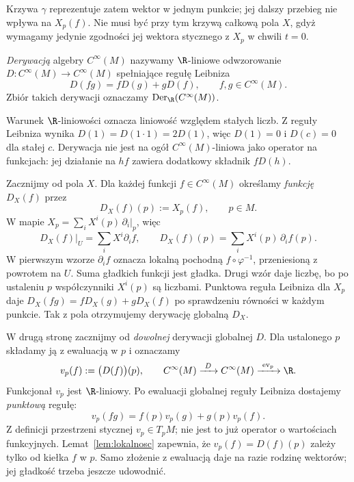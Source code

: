 Krzywa $\gamma$ reprezentuje zatem wektor w jednym
punkcie; jej dalszy przebieg nie wpływa na $X_p(f)$.
Nie musi być przy tym krzywą całkową pola $X$,
gdyż wymagamy jedynie zgodności jej wektora stycznego
z $X_p$ w chwili $t=0$.


\begin{definicja}
\emph{Derywacją} algebry $C^\infty(M)$ nazywamy $\R$-liniowe odwzorowanie
$D\colon C^\infty(M)\to C^\infty(M)$ spełniające regułę Leibniza
\[
 D(fg)=fD(g)+gD(f),\qquad f,g\in C^\infty(M).
\]
Zbiór takich derywacji oznaczamy $\operatorname{Der}_{\R}(C^\infty(M))$.
\end{definicja}

Warunek $\R$-liniowości oznacza liniowość względem stałych liczb.
Z reguły Leibniza wynika $D(1)=D(1\cdot1)=2D(1)$, więc $D(1)=0$
i $D(c)=0$ dla stałej $c$. Derywacja nie jest na ogół
$C^\infty(M)$-liniowa jako operator na funkcjach: jej działanie na
$hf$ zawiera dodatkowy składnik $fD(h)$.

Zacznijmy od pola $X$. Dla każdej funkcji $f\in C^\infty(M)$ określamy
\emph{funkcję} $D_X(f)$ przez
\[
 D_X(f)(p):=X_p(f),\qquad p\in M.
\]
W mapie $X_p=\sum_iX^i(p)\,\partial_i|_p$, więc
\[
 D_X(f)\big|_U=\sum_i X^i\partial_i f,
 \qquad D_X(f)(p)=\sum_iX^i(p)\,\partial_i f(p).
\]
W pierwszym wzorze $\partial_i f$ oznacza lokalną pochodną
$f\circ\varphi^{-1}$, przeniesioną z powrotem na $U$.
Suma gładkich funkcji jest gładka. Drugi wzór daje liczbę, bo
po ustaleniu $p$ współczynniki $X^i(p)$ są liczbami.
Punktowa reguła Leibniza dla $X_p$ daje
$D_X(fg)=fD_X(g)+gD_X(f)$ po sprawdzeniu równości w każdym punkcie.
Tak z pola otrzymujemy derywację globalną $D_X$.

W drugą stronę zacznijmy od \emph{dowolnej} derywacji globalnej $D$.
Dla ustalonego $p$ składamy ją z ewaluacją w $p$ i oznaczamy
\[
 v_p(f):=\bigl(D(f)\bigr)(p),\qquad
 C^\infty(M)\xrightarrow{\ D\ }C^\infty(M)
 \xrightarrow{\ \operatorname{ev}_p\ }\R.
\]
Funkcjonał $v_p$ jest $\R$-liniowy. Po ewaluacji globalnej
reguły Leibniza dostajemy \emph{punktową} regułę:
\[
 v_p(fg)=f(p)v_p(g)+g(p)v_p(f).
\]
Z definicji przestrzeni stycznej $v_p\in T_pM$; nie jest to już
operator o wartościach funkcyjnych. Lemat~\ref{lem:lokalnosc}
zapewnia, że $v_p(f)=D(f)(p)$ zależy tylko od kiełka $f$ w $p$.
Samo złożenie z ewaluacją daje na razie rodzinę wektorów;
jej gładkość trzeba jeszcze udowodnić.

